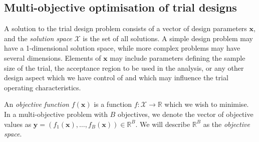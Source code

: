 \documentclass{article} %
\begin{document}


\subsection{Multi-objective optimisation of trial designs}\label{sec:optimisation}

A solution to the trial design problem consists of a vector of design parameters $\mathbf{x}$, and the \emph{solution space} $\mathcal{X}$ is the set of all solutions. A simple design problem may have a 1-dimensional solution space, while more complex problems may have several dimensions. Elements of $\mathbf{x}$ may include parameters defining the sample size of the trial, the 	acceptance region to be used in the analysis, or any other design aspect which we have control of and which may influence the trial operating characteristics.

An \emph{objective function} $f(\mathbf{x})$ is a function $f : \mathcal{X} \rightarrow \mathbb{R}$ which we wish to minimise. In a multi-objective problem with $B$ objectives, we denote the vector of objective values as $\mathbf{y} = (f_{1}(\mathbf{x}), \ldots, f_{B}(\mathbf{x})) \in \mathbb{R}^{B}$. We will describe $\mathbb{R}^{B}$ as the \emph{objective space}.
\end{document}
